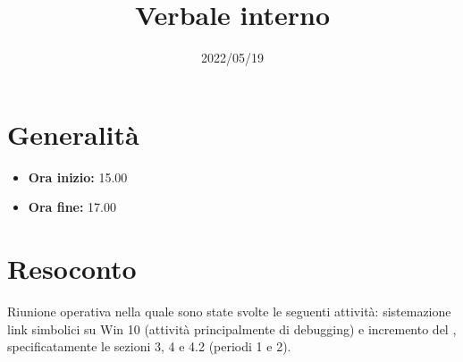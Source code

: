 \documentclass{classes/base}
\title{Verbale interno}
\date{2022/05/19}
\author{\marcob}
\renewcommand{\maketitle}{
    
}
\begin{document}
    \maketitle

    \section*{Generalità}
    \begin{itemize}
        \item \textbf{Ora inizio:} 15.00
        \item \textbf{Ora fine:} 17.00
    \end{itemize}

    \section*{Resoconto}
    Riunione operativa nella quale sono state svolte le seguenti attività: sistemazione link simbolici 
    su Win 10 (attività principalmente di debugging) e incremento del \PdP, specificatamente le sezioni
    3, 4 e 4.2 (periodi 1 e 2). 
\end{document}
